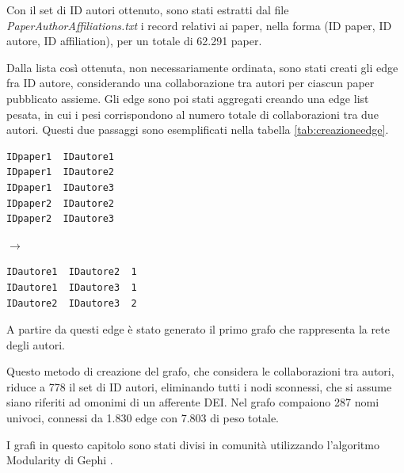 \documentclass[12pt,a4paper,twoside]{report}
\begin{document}
Con il set di ID autori ottenuto, sono stati estratti dal file \textit{PaperAuthorAffiliations.txt}
i record relativi ai paper, nella forma (ID paper, ID autore, ID affiliation), per un totale di
62.291 paper.

Dalla lista così ottenuta, non necessariamente ordinata, sono stati creati gli edge fra ID autore,
considerando una collaborazione tra autori per ciascun paper pubblicato assieme. Gli edge sono poi
stati aggregati creando una edge list pesata, in cui i pesi corrispondono al numero totale di
collaborazioni tra due autori. Questi due passaggi sono esemplificati nella tabella
\ref{tab:creazioneedge}.

\begin{center}

\label{tab:creazioneedge}
\begin{minipage}{0.40\textwidth}
\begin{verbatim}
IDpaper1  IDautore1
IDpaper1  IDautore2
IDpaper1  IDautore3
IDpaper2  IDautore2
IDpaper2  IDautore3
\end{verbatim}
\end{minipage}
\begin{minipage}{0.075\textwidth}
$\rightarrow$
\end{minipage}
\begin{minipage}{0.40\textwidth}
\begin{verbatim}
IDautore1  IDautore2  1
IDautore1  IDautore3  1
IDautore2  IDautore3  2
\end{verbatim}
\end{minipage}
\end{center}
A partire da questi edge è stato generato il primo grafo che rappresenta la rete degli autori.

Questo metodo di creazione del grafo, che considera le collaborazioni tra autori, riduce a 778 il
set di ID autori, eliminando tutti i nodi sconnessi, che si assume siano riferiti ad omonimi di un
afferente DEI. Nel grafo compaiono 287 nomi univoci, connessi da 1.830 edge con 7.803 di peso
totale.

I grafi in questo capitolo sono stati divisi in comunità utilizzando l'algoritmo Modularity di
Gephi \cite{2008JSMTE..10..008B}.
\end{document}
